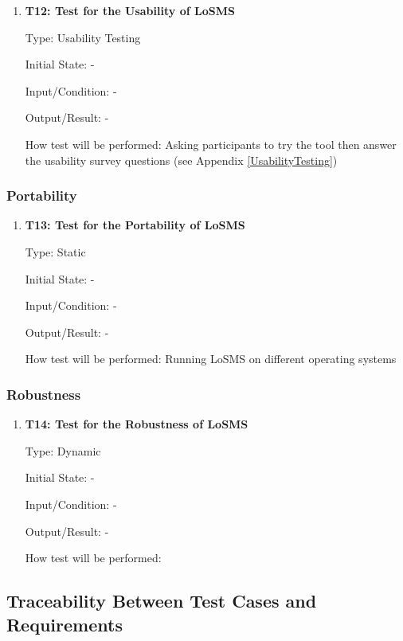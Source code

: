 \documentclass[12pt, titlepage]{article}
\newcommand{\famname}{LoSMS} %
\begin{document}
\begin{enumerate}
	\item{\textbf{T12: Test for the Usability of \famname{}}}
	
	Type: Usability Testing
						
	Initial State: -
						
	Input/Condition: -
						
	Output/Result: -
						
	How test will be performed: Asking participants to try the tool then answer 
	the usability survey questions (see Appendix \ref{UsabilityTesting})
\end{enumerate}

\subsubsection{Portability}

\begin{enumerate}
	\item{\textbf{T13: Test for the Portability of \famname{}}}
	
	Type: Static 
	
	Initial State: -
	
	Input/Condition: -
	
	Output/Result: -
	
	How test will be performed: Running \famname{} on different operating 
	systems
\end{enumerate}

\subsubsection{Robustness}

\begin{enumerate}
	\item{\textbf{T14: Test for the Robustness of \famname{}}}
	
	Type: Dynamic 
	
	Initial State: -
	
	Input/Condition: -
	
	Output/Result: -
	
	How test will be performed: 
\end{enumerate}

\subsection{Traceability Between Test Cases and Requirements}
\end{document}
